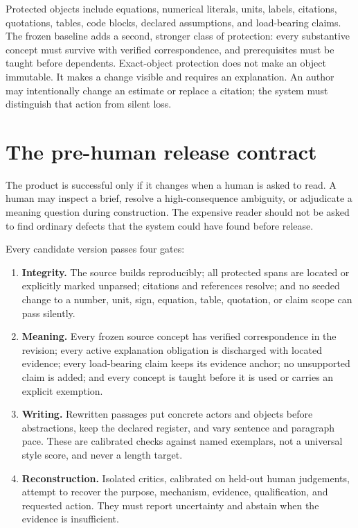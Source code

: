 Protected objects include equations, numerical literals, units, labels,
citations, quotations, tables, code blocks, declared assumptions, and
load-bearing claims. The frozen baseline adds a second, stronger class of
protection: every substantive concept must survive with verified correspondence,
and prerequisites must be taught before dependents. Exact-object protection
does not make an object immutable. It makes a change visible and requires an
explanation. An author may intentionally change an estimate or replace a
citation; the system must distinguish that action from silent loss.

\section{The pre-human release contract}

The product is successful only if it changes when a human is asked to read. A
human may inspect a brief, resolve a high-consequence ambiguity, or adjudicate a
meaning question during construction. The expensive reader should not be asked
to find ordinary defects that the system could have found before release.

Every candidate version passes four gates:

\begin{enumerate}
\item \textbf{Integrity.} The source builds reproducibly; all protected spans
      are located or explicitly marked unparsed; citations and references
      resolve; and no seeded change to a number, unit, sign, equation, table,
      quotation, or claim scope can pass silently.
\item \textbf{Meaning.} Every frozen source concept has verified correspondence
      in the revision; every active explanation obligation is discharged with
      located evidence; every load-bearing claim keeps its evidence anchor; no
      unsupported claim is added; and every concept is taught before it is used
      or carries an explicit exemption.
\item \textbf{Writing.} Rewritten passages put concrete actors and objects before
      abstractions, keep the declared register, and vary sentence and paragraph
      pace. These are calibrated checks against named exemplars, not a universal
      style score, and never a length target.
\item \textbf{Reconstruction.} Isolated critics, calibrated on held-out human
      judgements, attempt to recover the purpose, mechanism, evidence,
      qualification, and requested action. They must report uncertainty and
      abstain when the evidence is insufficient.
\end{enumerate}

